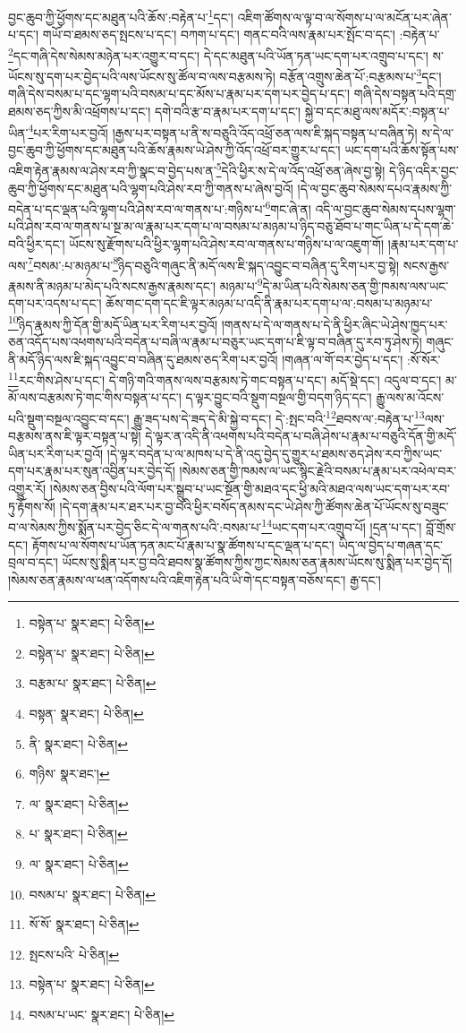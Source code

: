 བྱང་ཆུབ་ཀྱི་ཕྱོགས་དང་མཐུན་པའི་ཆོས་:བརྟེན་པ་\footnote{བསྟེན་པ་  སྣར་ཐང་།  པེ་ཅིན། }དང་། འཇིག་ཚོགས་ལ་ལྟ་བ་ལ་སོགས་པ་ལ་མངོན་པར་ཞེན་པ་དང་། གཡོ་བ་ཐམས་ཅད་སྤངས་པ་དང་། བཀག་པ་དང་། གནང་བའི་ལས་རྣམ་པར་སྤོང་བ་དང་། :བརྟེན་པ་\footnote{བསྟེན་པ་  སྣར་ཐང་།  པེ་ཅིན། }དང་གཞི་དེས་སེམས་མཉེན་པར་འགྱུར་བ་དང་། དེ་དང་མཐུན་པའི་ཡོན་ཏན་ཡང་དག་པར་འགྲུབ་པ་དང་། ས་ཡོངས་སུ་དག་པར་བྱེད་པའི་ལས་ཡོངས་སུ་ཚོལ་བ་ལས་བརྩམས་ཏེ། བརྩོན་འགྲུས་ཆེན་པོ་:བརྩམས་པ་\footnote{བརྩམ་པ་  སྣར་ཐང་།  པེ་ཅིན། }དང་། གཞི་དེས་བསམ་པ་དང་ལྷག་པའི་བསམ་པ་དང་མོས་པ་རྣམ་པར་དག་པར་བྱེད་པ་དང་། གཞི་དེས་བསྟན་པའི་དགྲ་ཐམས་ཅད་ཀྱིས་མི་འཕྲོགས་པ་དང་། དགེ་བའི་རྩ་བ་རྣམ་པར་དག་པ་དང་། སྐྱེ་བ་དང་མཐུ་ལས་མདོར་:བསྟན་པ་ཡིན་\footnote{བསྟན་  སྣར་ཐང་།  པེ་ཅིན། }པར་རིག་པར་བྱའོ། །རྒྱས་པར་བསྟན་པ་ནི་ས་བཅུའི་འོད་འཕྲོ་ཅན་ལས་ཇི་སྐད་བསྟན་པ་བཞིན་ཏེ། ས་དེ་ལ་བྱང་ཆུབ་ཀྱི་ཕྱོགས་དང་མཐུན་པའི་ཆོས་རྣམས་ཡེ་ཤེས་ཀྱི་འོད་འཕྲོ་བར་གྱུར་པ་དང་། ཡང་དག་པའི་ཆོས་སྟོན་པས་འཇིག་རྟེན་རྣམས་ལ་ཤེས་རབ་ཀྱི་སྣང་བ་བྱེད་པས་ན་\footnote{ནི་  སྣར་ཐང་།  པེ་ཅིན། }དེའི་ཕྱིར་ས་དེ་ལ་འོད་འཕྲོ་ཅན་ཞེས་བྱ་སྟེ། དེ་ཉིད་འདིར་བྱང་ཆུབ་ཀྱི་ཕྱོགས་དང་མཐུན་པའི་ལྷག་པའི་ཤེས་རབ་ཀྱི་གནས་པ་ཞེས་བྱའོ། །དེ་ལ་བྱང་ཆུབ་སེམས་དཔའ་རྣམས་ཀྱི་བདེན་པ་དང་ལྡན་པའི་ལྷག་པའི་ཤེས་རབ་ལ་གནས་པ་:གཉིས་པ་\footnote{གཉིས་  སྣར་ཐང་། }གང་ཞེ་ན། འདི་ལ་བྱང་ཆུབ་སེམས་དཔས་ལྷག་པའི་ཤེས་རབ་ལ་གནས་པ་སྔ་མ་ལ་རྣམ་པར་དག་པ་ལ་བསམ་པ་མཉམ་པ་ཉིད་བཅུ་ཐོབ་པ་གང་ཡིན་པ་དེ་དག་ཆེ་བའི་ཕྱིར་དང་། ཡོངས་སུ་རྫོགས་པའི་ཕྱིར་ལྷག་པའི་ཤེས་རབ་ལ་གནས་པ་གཉིས་པ་ལ་འཇུག་གོ། །རྣམ་པར་དག་པ་ལས་\footnote{ལ་  སྣར་ཐང་།  པེ་ཅིན། }བསམ་:པ་མཉམ་པ་\footnote{པ་  སྣར་ཐང་།  པེ་ཅིན། }ཉིད་བཅུའི་གཞུང་ནི་མདོ་ལས་ཇི་སྐད་འབྱུང་བ་བཞིན་དུ་རིག་པར་བྱ་སྟེ། སངས་རྒྱས་རྣམས་ནི་མཉམ་པ་མེད་པའི་སངས་རྒྱས་རྣམས་དང་། མཉམ་པ་\footnote{ལ་  སྣར་ཐང་།  པེ་ཅིན། }དེ་མ་ཡིན་པའི་སེམས་ཅན་གྱི་ཁམས་ལས་ཡང་དག་པར་འདས་པ་དང་། ཆོས་གང་དག་དང་ཇི་ལྟར་མཉམ་པ་འདི་ནི་རྣམ་པར་དག་པ་ལ་:བསམ་པ་མཉམ་པ་\footnote{བསམ་པ་  སྣར་ཐང་།  པེ་ཅིན། }ཉིད་རྣམས་ཀྱི་དོན་གྱི་མདོ་ཡིན་པར་རིག་པར་བྱའོ། །གནས་པ་དེ་ལ་གནས་པ་དེ་ནི་ཕྱིར་ཞིང་ཡེ་ཤེས་ཁྱད་པར་ཅན་འདོད་པས་འཕགས་པའི་བདེན་པ་བཞི་ལ་རྣམ་པ་བཅུར་ཡང་དག་པ་ཇི་ལྟ་བ་བཞིན་དུ་རབ་ཏུ་ཤེས་ཏེ། གཞུང་ནི་མདོ་ཉིད་ལས་ཇི་སྐད་འབྱུང་བ་བཞིན་དུ་ཐམས་ཅད་རིག་པར་བྱའོ། །གཞན་ལ་གོ་བར་བྱེད་པ་དང་། :སོ་སོར་\footnote{སོ་སོ་  སྣར་ཐང་།  པེ་ཅིན། }རང་གིས་ཤེས་པ་དང་། དེ་གཉི་གའི་གནས་ལས་བརྩམས་ཏེ་གང་བསྟན་པ་དང་། མདོ་སྡེ་དང་། འདུལ་བ་དང་། མ་མོ་ལས་བརྩམས་ཏེ་གང་གིས་བསྟན་པ་དང་། ད་ལྟར་བྱུང་བའི་སྡུག་བསྔལ་གྱི་བདག་ཉིད་དང་། རྒྱུ་ལས་མ་འོངས་པའི་སྡུག་བསྔལ་འབྱུང་བ་དང་། རྒྱུ་ཟད་པས་དེ་ཟད་དེ་མི་སྐྱེ་བ་དང་། དེ་:སྤང་བའི་\footnote{སྤངས་པའི་  པེ་ཅིན། }ཐབས་ལ་:བརྟེན་པ་\footnote{བསྟེན་པ་  སྣར་ཐང་།  པེ་ཅིན། }ལས་བརྩམས་ནས་ཇི་ལྟར་བསྟན་པ་སྟེ། དེ་ལྟར་ན་འདི་ནི་འཕགས་པའི་བདེན་པ་བཞི་ཤེས་པ་རྣམ་པ་བཅུའི་དོན་གྱི་མདོ་ཡིན་པར་རིག་པར་བྱའོ། །དེ་ལྟར་བདེན་པ་ལ་མཁས་པ་དེ་ནི་འདུ་བྱེད་དུ་གྱུར་པ་ཐམས་ཅད་ཤེས་རབ་ཀྱིས་ཡང་དག་པར་རྣམ་པར་སུན་འབྱིན་པར་བྱེད་དོ། །སེམས་ཅན་གྱི་ཁམས་ལ་ཡང་སྙིང་རྗེའི་བསམ་པ་རྣམ་པར་འཕེལ་བར་འགྱུར་རོ། །སེམས་ཅན་བྱིས་པའི་ལོག་པར་སྒྲུབ་པ་ཡང་སྔོན་གྱི་མཐའ་དང་ཕྱི་མའི་མཐའ་ལས་ཡང་དག་པར་རབ་ཏུ་རྟོགས་སོ། །དེ་དག་རྣམ་པར་ཐར་པར་བྱ་བའི་ཕྱིར་བསོད་ནམས་དང་ཡེ་ཤེས་ཀྱི་ཚོགས་ཆེན་པོ་ཡོངས་སུ་བཟུང་བ་ལ་སེམས་ཀྱིས་སྨོན་པར་བྱེད་ཅིང་དེ་ལ་གནས་པའི་:བསམ་པ་\footnote{བསམ་པ་ཡང་  སྣར་ཐང་།  པེ་ཅིན། }ཡང་དག་པར་འགྲུབ་པོ། །དྲན་པ་དང་། བློ་གྲོས་དང་། རྟོགས་པ་ལ་སོགས་པ་ཡོན་ཏན་མང་པོ་རྣམ་པ་སྣ་ཚོགས་པ་དང་ལྡན་པ་དང་། ཡིད་ལ་བྱེད་པ་གཞན་དང་བྲལ་བ་དང་། ཡོངས་སུ་སྨིན་པར་བྱ་བའི་ཐབས་སྣ་ཚོགས་ཀྱིས་ཀྱང་སེམས་ཅན་རྣམས་ཡོངས་སུ་སྨིན་པར་བྱེད་དོ། །སེམས་ཅན་རྣམས་ལ་ཕན་འདོགས་པའི་འཇིག་རྟེན་པའི་ཡི་གེ་དང་བསྟན་བཅོས་དང་། རྒྱ་དང་། 